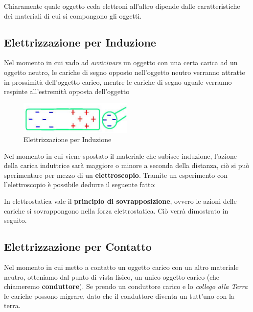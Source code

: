 Chiaramente quale oggetto ceda elettroni all'altro dipende dalle caratteristiche dei materiali di cui si compongono gli oggetti.

\subsection{Elettrizzazione per Induzione}
Nel momento in cui vado ad \textit{avvicinare} un oggetto con una certa carica ad un oggetto neutro, le cariche di segno opposto nell'oggetto neutro verranno attratte in prossimità dell'oggetto carico, mentre le cariche di segno uguale verranno respinte all'estremità opposta dell'oggetto

\begin{figure}[ht]
	\begin{center}
		\includegraphics[width=0.5\textwidth]{./Media/Induzione.png}
		\caption{Elettrizzazione per Induzione}
	\end{center}
\end{figure}

Nel momento in cui viene spostato il materiale che subisce induzione, l'azione della carica induttrice sarà maggiore o minore a seconda della distanza, ciò si può sperimentare per mezzo di un \textbf{elettroscopio}.  Tramite un esperimento con l'elettroscopio è possibile dedurre il seguente fatto: 

\begin{tcolorbox}
	\begin{center}
		In elettrostatica vale il \textbf{principio di sovrapposizione}, ovvero le azioni delle cariche si sovrappongono nella forza elettrostatica. Ciò verrà dimostrato in seguito.
	\end{center}
\end{tcolorbox}


\subsection{Elettrizzazione per Contatto}
Nel momento in cui metto a contatto un oggetto carico con un altro materiale neutro, otteniamo dal punto di vista fisico, un unico oggetto carico (che chiameremo \textbf{conduttore}). Se prendo un conduttore carico e lo \textit{collego alla Terra} le cariche possono migrare, dato che il conduttore diventa un tutt'uno con la terra. 

